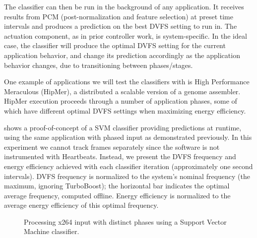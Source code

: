 The classifier can then be run in the background of any application.
It receives results from PCM (post-normalization and feature selection) at preset time intervals and produces a prediction on the best DVFS setting to run in.
The actuation component, as in prior controller work, is system-specific.
In the ideal case, the classifier will produce the optimal DVFS setting for the current application behavior, and change its prediction accordingly as the application behavior changes, \eg due to transitioning between phases/stages.

One example of applications we will test the classifiers with is High Performance Meraculous (HipMer), a distributed a scalable version of a genome assembler.
HipMer execution proceeds through a number of application phases, some of which have different optimal DVFS settings when maximizing energy efficiency.

 shows a proof-of-concept of a SVM classifier providing predictions at runtime, using the same  application with phased input as demonstrated previously.
In this experiment we cannot track frames separately since the software is not instrumented with Heartbeats.
Instead, we present the DVFS frequency and energy efficiency achieved with each classifier iteration (approximately one second intervals).
DVFS frequency is normalized to the system's nominal frequency (the maximum, ignoring TurboBoost); the horizontal bar indicates the optimal average frequency, computed offline.
Energy efficiency is normalized to the average energy efficiency of this optimal frequency.

\begin{figure}[t]
  
  \caption{Processing x264 input with distinct phases using a Support Vector Machine classifier.}
  \label{fig:classifier-phases-x264}
\end{figure}

